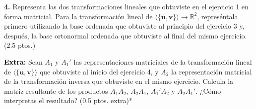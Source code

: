 \documentclass[a4paper]{article}
\begin{document}
\vspace{5mm}
\textbf{4.} Representa las dos transformaciones lineales que obtuviste en el ejercicio 1 en forma matricial. Para la transformación lineal de $\langle\{\mathbf{u},\mathbf{v}\}\rangle\to \mathbb{R}^2$, represéntala primero utilizando la base ordenada que obtuviste al principio del ejercicio 3 y, después, la base ortonormal ordenada que obtuviste al final del mismo ejercicio. (2.5 ptos.)

\vspace{5mm}
\textbf{Extra:} Sean $A_1$ y $A_1'$ las representaciones matriciales de la transformación lineal de $\langle\{\mathbf{u},\mathbf{v}\}\rangle$ que obtuviste al inicio del ejercicio 4, y $A_2$ la representación matricial de la transformación inversa que obtuviste en el mismo ejercicio. Calcula la matriz resultante de los productos $A_1A_2$, $A_2A_1$, $A_1'A_2$ y $A_2A_1'$. ¿Cómo interpretas el resultado? (0.5 ptos. extra)*
\end{document}
